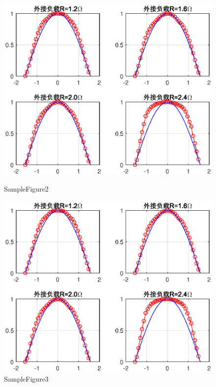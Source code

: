 {\begin{spacing}{1.5}
\begin{figure}[htb]
	\begin{minipage}[b]{0.5\textwidth}
		\flushleft
		\includegraphics[width=\textwidth,trim=35 20 20 0,clip]{figure//fig_calculate}
		\caption{SampleFigure2}\label{samplefigure2}
	\end{minipage}
	\hfill
	\begin{minipage}[b]{0.5\textwidth}
		\flushright
		\includegraphics[width=\textwidth,trim=20 20 35 0,clip]{figure//fig_calculate}
		\caption{SampleFigure3}\label{samplefigure3}
	\end{minipage}
\end{figure}


\end{spacing}}
